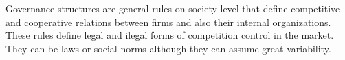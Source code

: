 \documentclass[a4paper, 12pt, openright, oneside, german, french, brazil, english, article]{abntex2}
\begin{document}
	
	
	Governance structures are general rules on society level that define competitive and cooperative relations between firms and also their internal organizations. These rules define legal and ilegal forms of competition control in the market. They can be laws or social norms although they can assume great variability.
	
	
	
\end{document}
